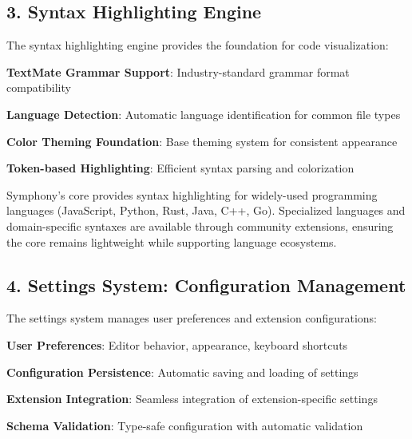 \subsection*{3. Syntax Highlighting Engine}

The syntax highlighting engine provides the foundation for code visualization:

\begin{compactlist}
    \item \textbf{TextMate Grammar Support}: Industry-standard grammar format compatibility
    \item \textbf{Language Detection}: Automatic language identification for common file types
    \item \textbf{Color Theming Foundation}: Base theming system for consistent appearance
    \item \textbf{Token-based Highlighting}: Efficient syntax parsing and colorization
\end{compactlist}

\begin{infobox}[title=Language Support Strategy]
Symphony's core provides syntax highlighting for widely-used programming languages (JavaScript, Python, Rust, Java, C++, Go). Specialized languages and domain-specific syntaxes are available through community extensions, ensuring the core remains lightweight while supporting language ecosystems.
\end{infobox}

\subsection*{4. Settings System: Configuration Management}

The settings system manages user preferences and extension configurations:

\begin{compactlist}
    \item \textbf{User Preferences}: Editor behavior, appearance, keyboard shortcuts
    \item \textbf{Configuration Persistence}: Automatic saving and loading of settings
    \item \textbf{Extension Integration}: Seamless integration of extension-specific settings
    \item \textbf{Schema Validation}: Type-safe configuration with automatic validation
\end{compactlist}

